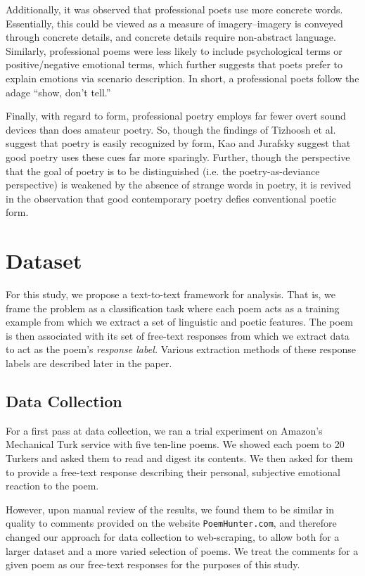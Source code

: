 \documentclass[11pt]{article}
\begin{document}
Additionally, it was observed that professional poets use more concrete words. Essentially, this could be viewed as a measure of imagery--imagery is conveyed through concrete details, and concrete details require non-abstract language. Similarly, professional poems were less likely to include psychological terms or positive/negative emotional terms, which further suggests that poets prefer to explain emotions via scenario description. In short, a professional poets follow the adage ``show, don't tell.''

Finally, with regard to form, professional poetry employs far fewer overt sound devices than does amateur poetry. So, though the findings of Tizhoosh et al. suggest that poetry is easily recognized by form, Kao and Jurafsky suggest that good poetry uses these cues far more sparingly. Further, though the perspective that the goal of poetry is to be distinguished (i.e. the poetry-as-deviance perspective) is weakened by the absence of strange words in poetry, it is revived in the observation that good contemporary poetry defies conventional poetic form.

\section{Dataset}
For this study, we propose a text-to-text framework for analysis. That is, we frame the problem as a classification task where each poem acts as a training example from which we extract a set of linguistic and poetic features. The poem is then associated with its set of free-text responses from which we extract data to act as the poem's \emph{response label.} Various extraction methods of these response labels are described later in the paper. %

\subsection{Data Collection}
For a first pass at data collection, we ran a trial experiment on Amazon's Mechanical Turk service with five ten-line poems. We showed each poem to 20 Turkers and asked them to read and digest its contents. We then asked for them to provide a free-text response describing their personal, subjective emotional reaction to the poem. 

However, upon manual review of the results, we found them to be similar in quality to comments provided on the website \texttt{PoemHunter.com}, and therefore changed our approach for data collection to web-scraping, to allow both for a larger dataset and a more varied selection of poems. We treat the comments for a given poem as our free-text responses for the purposes of this study.
\end{document}
